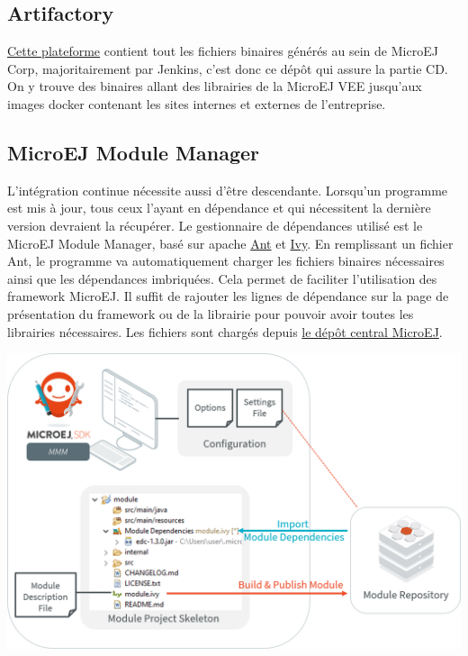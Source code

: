 \documentclass[french,a4paper,12pt]{report}
\begin{document}
\subsection{Artifactory}

\href{https://www.jfrog.com/}{Cette plateforme} contient tout les fichiers binaires générés au sein de MicroEJ Corp, majoritairement par Jenkins, c'est donc ce dépôt qui assure la partie CD. On y trouve des binaires allant des librairies de la MicroEJ VEE jusqu'aux images docker contenant les sites internes et externes de l'entreprise.

\subsection{MicroEJ Module Manager}
L’intégration continue nécessite aussi d'être descendante. Lorsqu'un programme est mis à jour, tous ceux l'ayant en dépendance et qui nécessitent la dernière version devraient la récupérer.
Le gestionnaire de dépendances utilisé est le MicroEJ Module Manager, basé sur apache \href{https://ant.apache.org/}{Ant} et \href{https://ant.apache.org/ivy/}{Ivy}. En remplissant un fichier Ant, le programme va automatiquement charger les fichiers binaires nécessaires ainsi que les dépendances imbriquées. Cela permet de faciliter l’utilisation des framework MicroEJ. Il suffit de rajouter les lignes de dépendance sur la page de présentation du framework ou de la librairie pour pouvoir avoir toutes les librairies nécessaires. Les fichiers sont chargés depuis \href{https://docs.microej.com/en/latest/overview/repository.html#central-repository}{le dépôt central MicroEJ}.

\begin{center}
\includegraphics[width=.8\textwidth]{./ressources/schemas/mmm_flow.png}
\end{center}
\end{document}
